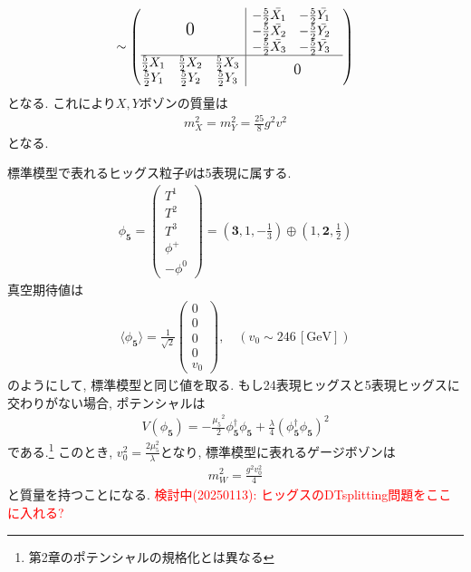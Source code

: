 \begin{align}
  [V_\mu, \Sigma] \sim \left(\begin{array}{@{}c|c@{}}
      {\Large{\mbox{$0$}}} &
      \begin{matrix}
        -\frac{5}{2}\bar{X_1} & -\frac{5}{2}\bar{Y_1} &   \\
        -\frac{5}{2}\bar{X_2} & -\frac{5}{2}\bar{Y_2} &   \\
        -\frac{5}{2}\bar{X_3} & -\frac{5}{2}\bar{Y_3} &   \\
      \end{matrix} \\
      \hline
      \begin{matrix}
        \frac{5}{2}X_1 & \frac{5}{2}X_2 & \frac{5}{2}X_3 \\
        \frac{5}{2}Y_1 & \frac{5}{2}Y_2 & \frac{5}{2}Y_3 \\
      \end{matrix} & {\large{\mbox{$0$}}}
  \end{array}\right)
\end{align}  
となる.
これにより$X, Y$ボゾンの質量は
\begin{align}
  m_X^2 = m_Y^2 = \frac{25}{8}g^2v^2
\end{align}
となる.

標準模型で表れるヒッグス粒子$\Psi$は5表現に属する.
\begin{align}
  \phi_{\bm{5}} = \left(
  \begin{array}{c}
      T^1 \\
      T^2 \\
      T^3 \\
      \phi^+ \\
      -\phi^0
  \end{array}\right) =\left(\bm{3}, 1,-\frac{1}{3}\right)\oplus\left(1,\bm{2},\frac{1}{2}\right)\label{Higgs_5}
\end{align}
真空期待値は
\begin{align}
  \langle\phi_{\bm{5}}\rangle = \frac{1}{\sqrt{2}}\left(
  \begin{array}{c}
      0 \\
      0 \\
      0 \\
      0 \\
      v_0
  \end{array}\right),\quad(v_0\sim 246\,[\mathrm{GeV}])
\end{align}
のようにして, 標準模型と同じ値を取る.
もし24表現ヒッグスと5表現ヒッグスに交わりがない場合, ポテンシャルは
\begin{align}
  V(\phi_{\bm{5}}) = -\frac{{\mu_5}^2}{2}\phi_{\bm{5}}^\dagger \phi_{\bm{5}} + \frac{\lambda}{4}(\phi_{\bm{5}}^\dagger \phi_{\bm{5}})^2
\end{align}
である.\footnote{第2章のポテンシャルの規格化とは異なる}
このとき, $v_0^2 =\frac{2\mu_5^2}{\lambda}$となり, 標準模型に表れるゲージボゾンは
\begin{align}
  m_W^2 = \frac{g^2 v_0^2}{4}
\end{align}
と質量を持つことになる.
\textcolor{red}{検討中(20250113): ヒッグスのDTsplitting問題をここに入れる?}

